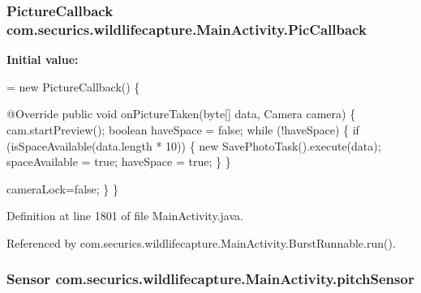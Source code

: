 \subsubsection[{Pic\+Callback}]{\setlength{\rightskip}{0pt plus 5cm}Picture\+Callback com.\+securics.\+wildlifecapture.\+Main\+Activity.\+Pic\+Callback\hspace{0.3cm}{\ttfamily [private]}}\label{classcom_1_1securics_1_1wildlifecapture_1_1_main_activity_a2ad6c918b2929c0c05f62204c339813c}
{\bfseries Initial value\+:}
\begin{DoxyCode}
= \textcolor{keyword}{new} PictureCallback() \{

        @Override
        \textcolor{keyword}{public} \textcolor{keywordtype}{void} onPictureTaken(byte[] data, Camera camera) \{
            cam.startPreview();
            \textcolor{keywordtype}{boolean} haveSpace = \textcolor{keyword}{false};
            \textcolor{keywordflow}{while} (!haveSpace) \{
                \textcolor{keywordflow}{if} (isSpaceAvailable(data.length * 10)) \{
                    \textcolor{keyword}{new} SavePhotoTask().execute(data);
                    spaceAvailable = \textcolor{keyword}{true};
                    haveSpace = \textcolor{keyword}{true};
                \}
            \}
            
            
            cameraLock=\textcolor{keyword}{false};
        \}
    \}
\end{DoxyCode}


Definition at line 1801 of file Main\+Activity.\+java.



Referenced by com.\+securics.\+wildlifecapture.\+Main\+Activity.\+Burst\+Runnable.\+run().

\subsubsection[{pitch\+Sensor}]{\setlength{\rightskip}{0pt plus 5cm}Sensor com.\+securics.\+wildlifecapture.\+Main\+Activity.\+pitch\+Sensor\hspace{0.3cm}{\ttfamily [static]}}\label{classcom_1_1securics_1_1wildlifecapture_1_1_main_activity_a26a1e373456f6f832b8cbb54b460c20e}


